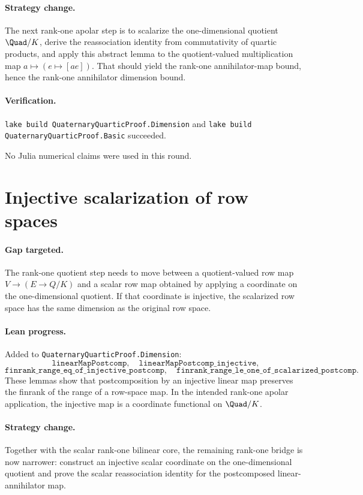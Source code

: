 \documentclass[11pt]{article}
\begin{document}
\paragraph{Strategy change.}
The next rank-one apolar step is to scalarize the one-dimensional quotient
\(\Quad/K\), derive the reassociation identity from commutativity of quartic
products, and apply this abstract lemma to the quotient-valued multiplication
map \(a\mapsto(e\mapsto [ae])\).  That should yield the rank-one
annihilator-map bound, hence the rank-one annihilator dimension bound.

\paragraph{Verification.}
\texttt{lake build QuaternaryQuarticProof.Dimension} and
\texttt{lake build QuaternaryQuarticProof.Basic} succeeded.

No Julia numerical claims were used in this round.

\section*{Injective scalarization of row spaces}

\paragraph{Gap targeted.}
The rank-one quotient step needs to move between a quotient-valued row map
\(V\to (E\to Q/K)\) and a scalar row map obtained by applying a coordinate on
the one-dimensional quotient.  If that coordinate is injective, the scalarized
row space has the same dimension as the original row space.

\paragraph{Lean progress.}
Added to \texttt{QuaternaryQuarticProof.Dimension}:
\[
\texttt{linearMapPostcomp},
\quad
\texttt{linearMapPostcomp\_injective},
\]
\[
\texttt{finrank\_range\_eq\_of\_injective\_postcomp},
\quad
\texttt{finrank\_range\_le\_one\_of\_scalarized\_postcomp}.
\]
These lemmas show that postcomposition by an injective linear map preserves the
finrank of the range of a row-space map.  In the intended rank-one apolar
application, the injective map is a coordinate functional on \(\Quad/K\).

\paragraph{Strategy change.}
Together with the scalar rank-one bilinear core, the remaining rank-one bridge
is now narrower: construct an injective scalar coordinate on the one-dimensional
quotient and prove the scalar reassociation identity for the postcomposed
linear-annihilator map.
\end{document}
